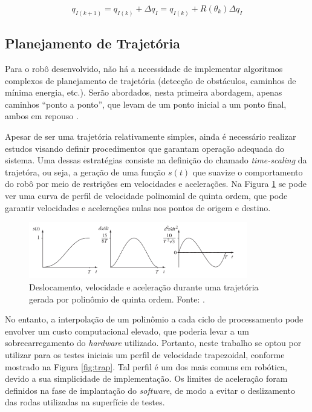 \begin{equation}
  q_{I(k+1)} = q_{I(k)} + \Delta q_I = q_{I(k)} + R(\theta_k) \Delta q_I
  \label{eq:new_odo}
\end{equation}

\subsection{Planejamento de Trajetória}

Para o robô desenvolvido, não há a necessidade de implementar algoritmos complexos de planejamento de trajetória (detecção de obstáculos, caminhos de mínima energia, etc.). Serão abordados, nesta primeira abordagem, apenas caminhos ``ponto a ponto'', que levam de um ponto inicial a um ponto final, ambos em repouso \citep{lynch2017modern}.

Apesar de ser uma trajetória relativamente simples, ainda é necessário realizar estudos visando definir procedimentos que garantam operação adequada do sistema. Uma dessas estratégias consiste na definição do chamado \textit{time-scaling} da trajetóra, ou seja, a geração de uma função $s(t)$ que suavize o comportamento do robô por meio de restrições em velocidades e acelerações. Na Figura \ref{fig:poly5} se pode ver uma curva de perfil de velocidade polinomial de quinta ordem, que pode garantir velocidades e acelerações nulas nos pontos de origem e destino.

\begin{figure}[h]
  \centering
  \includegraphics[width = 0.85\textwidth]{imagens/poly5}
  \caption{Deslocamento, velocidade e aceleração durante uma trajetória gerada por polinômio de quinta ordem. Fonte: \citet{lynch2017modern}.}
  \label{fig:poly5}
\end{figure}

No entanto, a interpolação de um polinômio a cada ciclo de processamento pode envolver um custo computacional elevado, que poderia levar a um sobrecarregamento do \textit{hardware} utilizado. Portanto, neste trabalho se optou por utilizar para os testes iniciais um perfil de velocidade trapezoidal, conforme mostrado na Figura \ref{fig:trap}. Tal perfil é um dos mais comuns em robótica, devido a sua simplicidade de implementação. Os limites de aceleração foram definidos na fase de implantação do \textit{software}, de modo a evitar o deslizamento das rodas utilizadas na superfície de testes.

